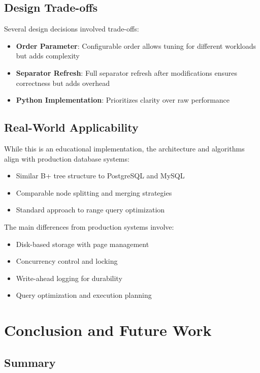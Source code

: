 \documentclass[conference]{IEEEtran}
\begin{document}
\subsection{Design Trade-offs}

Several design decisions involved trade-offs:

\begin{itemize}
    \item \textbf{Order Parameter}: Configurable order allows tuning for different workloads but adds complexity
    \item \textbf{Separator Refresh}: Full separator refresh after modifications ensures correctness but adds overhead
    \item \textbf{Python Implementation}: Prioritizes clarity over raw performance
\end{itemize}

\subsection{Real-World Applicability}

While this is an educational implementation, the architecture and algorithms align with production database systems:

\begin{itemize}
    \item Similar B+ tree structure to PostgreSQL and MySQL
    \item Comparable node splitting and merging strategies
    \item Standard approach to range query optimization
\end{itemize}

The main differences from production systems involve:
\begin{itemize}
    \item Disk-based storage with page management
    \item Concurrency control and locking
    \item Write-ahead logging for durability
    \item Query optimization and execution planning
\end{itemize}

\section{Conclusion and Future Work}

\subsection{Summary}
\end{document}
